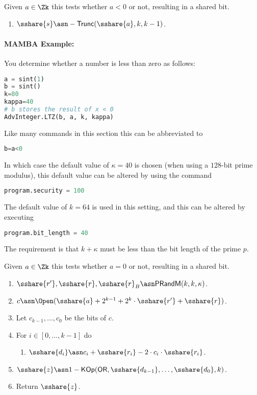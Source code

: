   Given $a \in \Zk$ this tests whether $a<0$ or not,
  resulting in a shared bit.
  \begin{enumerate}
    \item $\sshare{s} \asn - \mathsf{Trunc}(\sshare{a},k,k-1)$.
  \end{enumerate}

  \paragraph{MAMBA Example:} You determine whether a number is less than zero as follows:
  \begin{lstlisting}[language={python}]
a = sint(1)
b = sint()
k=80
kappa=40
# b stores the result of x < 0
AdvInteger.LTZ(b, a, k, kappa)
\end{lstlisting}
  Like many commands in this section this can be abbreviated to
  \begin{lstlisting}[language={python}]
b=a<0
\end{lstlisting}
  In which case the default value of $\kappa=40$ is chosen
  (when using a $128$-bit prime modulus), this default value can be
  altered by using the command
  \begin{lstlisting}[language={python}]
program.security = 100
\end{lstlisting}
  The default value of $k=64$ is used in this setting, and
  this can be altered by executing
  \begin{lstlisting}[language={python}]
program.bit_length = 40
\end{lstlisting}
  The requirement is that $k+\kappa$ must be less than the bit length
  of the prime $p$.


  Given $a \in \Zk$ this tests whether $a=0$ or not,
  resulting in a shared bit.
  \begin{enumerate}
    \item $\sshare{r'}, \sshare{r}, \sshare{r}_B \asn \mathsf{PRandM}(k,k,\kappa)$.
    \item $c \asn \Open(\sshare{a}+2^{k-1}+2^k \cdot \sshare{r'}+\sshare{r})$.
    \item Let $c_{k-1},\ldots,c_0$ be the bits of $c$.
    \item For $i \in [0,\ldots,k-1]$ do
          \begin{enumerate}
            \item $\sshare{d_i} \asn c_i+\sshare{r_i}-2 \cdot c_i \cdot \sshare{r_i}$.
          \end{enumerate}
    \item $\sshare{z} \asn 1- \mathsf{KOp}(\mathsf{OR},\sshare{d_{k-1}},\ldots,\sshare{d_0},k)$.
    \item Return $\sshare{z}$.
  \end{enumerate}

